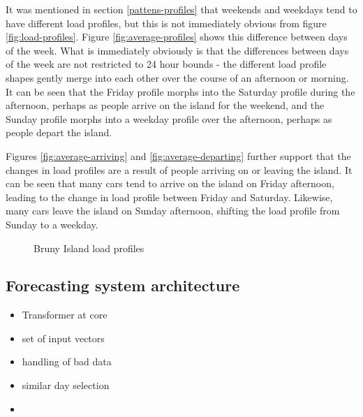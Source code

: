 It was mentioned in section \ref{pattens-profiles} that weekends and weekdays tend to have different load profiles, but this is not immediately obvious from figure \ref{fig:load-profiles}.
Figure \ref{fig:average-profiles} shows this difference between days of the week.
What is immediately obviously is that the differences between days of the week are not restricted to 24 hour bounds - the different load profile shapes gently merge into each other over the course of an afternoon or morning.
It can be seen that the Friday profile morphs into the Saturday profile during the afternoon, perhaps as people arrive on the island for the weekend, and the Sunday profile morphs into a weekday profile over the afternoon, perhaps as people depart the island.
\par
Figures \ref{fig:average-arriving} and \ref{fig:average-departing} further support that the changes in load profiles are a result of people arriving on or leaving the island.
It can be seen that many cars tend to arrive on the island on Friday afternoon, leading to the change in load profile between Friday and Saturday.
Likewise, many cars leave the island on Sunday afternoon, shifting the load profile from Sunday to a weekday.
\begin{figure}[htbp]
	\centering
	\vfil
	\vfil
	\caption{Bruny Island load profiles}
	\label{fig:average-load-profiles}
\end{figure}

\subsection{Forecasting system architecture}
\begin{itemize}
	\item Transformer at core
	\item set of input vectors
	\item handling of bad data
	\item similar day selection
	\item 
\end{itemize}